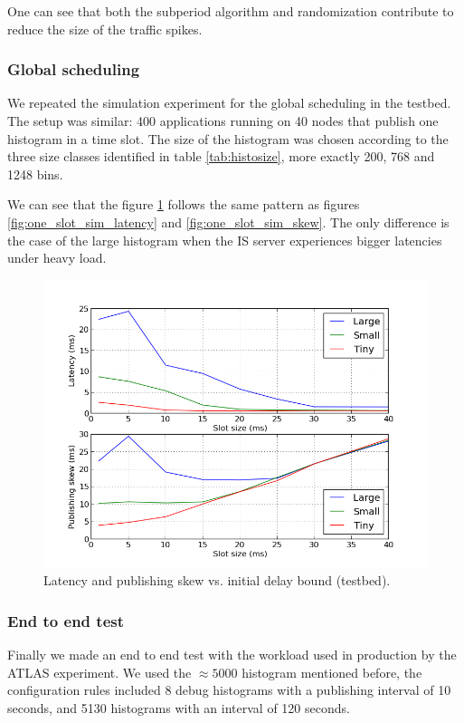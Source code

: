 One can see that both the subperiod algorithm and randomization contribute to reduce the size of the traffic spikes. 

\subsubsection*{Global scheduling}

We repeated the simulation experiment for the global scheduling in the testbed. The setup was similar: 400 applications running on 40 nodes that publish one histogram in a time slot. The size of the histogram was chosen according to the three size classes identified in table \ref{tab:histosize}, more exactly 200, 768 and 1248 bins. 

We can see that the figure \ref{fig:one_slot_tbed} follows the same pattern as figures \ref{fig:one_slot_sim_latency} and \ref{fig:one_slot_sim_skew}. The only difference is the case of the large histogram when the IS server experiences bigger latencies under heavy load.

\begin{figure}[ht]
\centering
\includegraphics[scale=0.6]{Images/one_slot_tbed.png}
\caption{Latency and publishing skew vs. initial delay bound (testbed).}
\label{fig:one_slot_tbed}
\end{figure}

\subsubsection*{End to end test}

Finally we made an end to end test with the workload used in production by the ATLAS experiment. We used the $\approx 5000$ histogram mentioned before, the configuration rules included 8 debug histograms with a publishing interval of 10 seconds, and 5130 histograms with an interval of 120 seconds. 

